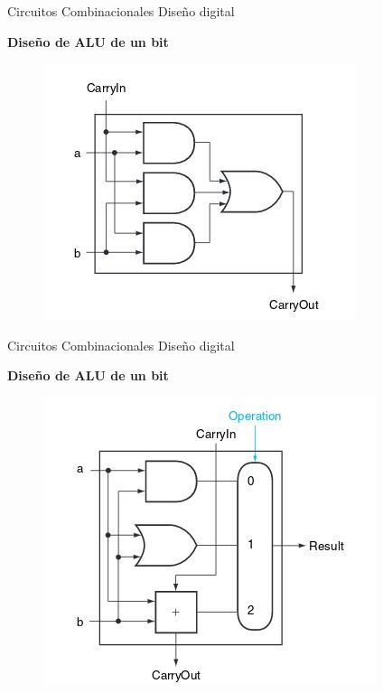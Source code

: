 \documentclass[aspectratio=169,compress]{beamer}
\begin{document}
\begin{footnotesize}
\begin{frame} {Circuitos Combinacionales} {Diseño digital}
\begin{center}\textbf{Diseño de ALU de un bit}\end{center}
\begin{figure}
\includegraphics[scale=0.4]{images/alu1bit-2.jpg} 
\end{figure}
\end{frame}




\begin{frame} {Circuitos Combinacionales} {Diseño digital}
\begin{center}\textbf{Diseño de ALU de un bit}\end{center}
\begin{figure}
\includegraphics[scale=0.4]{images/alu1bit-3.jpg} 
\end{figure}
\end{frame}



\end{footnotesize}
\end{document}
